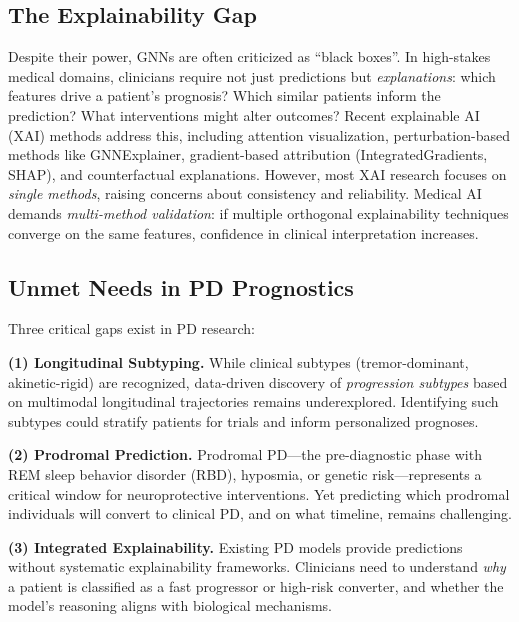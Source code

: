 \subsection*{The Explainability Gap}

Despite their power, GNNs are often criticized as ``black boxes''\cite{tjoa2020survey,ying2019gnnexplainer}. In high-stakes medical domains, clinicians require not just predictions but \textit{explanations}: which features drive a patient's prognosis? Which similar patients inform the prediction? What interventions might alter outcomes? Recent explainable AI (XAI) methods address this, including attention visualization\cite{bahdanau2015neural}, perturbation-based methods like GNNExplainer\cite{ying2019gnnexplainer}, gradient-based attribution (IntegratedGradients\cite{sundararajan2017axiomatic}, SHAP\cite{lundberg2017unified}), and counterfactual explanations\cite{wachter2017counterfactual}. However, most XAI research focuses on \textit{single methods}, raising concerns about consistency and reliability\cite{adebayo2018sanity,krishna2022disagreement}. Medical AI demands \textit{multi-method validation}: if multiple orthogonal explainability techniques converge on the same features, confidence in clinical interpretation increases.

\subsection*{Unmet Needs in PD Prognostics}

Three critical gaps exist in PD research:

\textbf{(1) Longitudinal Subtyping.} While clinical subtypes (tremor-dominant, akinetic-rigid) are recognized\cite{fereshtehnejad2017clinical}, data-driven discovery of \textit{progression subtypes} based on multimodal longitudinal trajectories remains underexplored. Identifying such subtypes could stratify patients for trials and inform personalized prognoses.

\textbf{(2) Prodromal Prediction.} Prodromal PD—the pre-diagnostic phase with REM sleep behavior disorder (RBD), hyposmia, or genetic risk—represents a critical window for neuroprotective interventions\cite{postuma2019validation}. Yet predicting which prodromal individuals will convert to clinical PD, and on what timeline, remains challenging\cite{heinzel2018predictors}.

\textbf{(3) Integrated Explainability.} Existing PD models provide predictions without systematic explainability frameworks. Clinicians need to understand \textit{why} a patient is classified as a fast progressor or high-risk converter, and whether the model's reasoning aligns with biological mechanisms.

